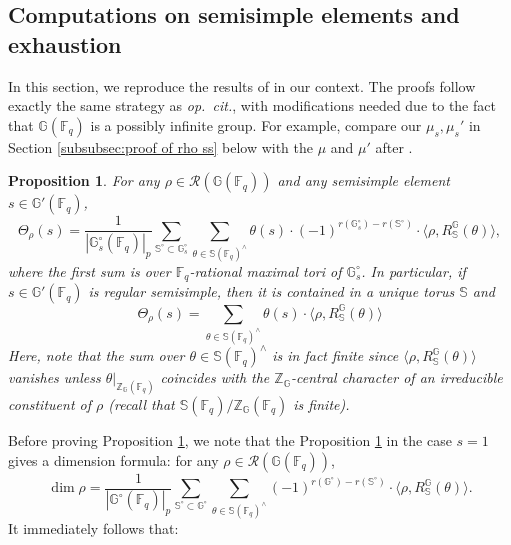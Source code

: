 \documentclass{amsart}
\newcommand{\F}{\mathbb{F}}
\newcommand{\FF}{\mathbb{F}}
\newcommand{\bbS}{\mathbb{S}}
\newcommand{\bbG}{\mathbb{G}}
\newcommand{\bbZ}{\mathbb{Z}}
\newcommand{\cR}{\mathcal{R}}
\theoremstyle{plain}
\newtheorem{prop}[thm]{Proposition}
\theoremstyle{definition}
\theoremstyle{remark}
\theoremstyle{theorem}
\begin{document}
\subsection{Computations on semisimple elements and exhaustion}\label{subsec:semisimple}

In this section, we reproduce the results of \cite[Section 7]{DL76} in our context. The proofs follow exactly the same strategy as \textit{op.\ cit.}, with modifications needed due to the fact that $\bbG(\FF_q)$ is a possibly infinite group. For example, compare our $\mu_s,\mu_s'$ in Section \ref{subsubsec:proof of rho ss} below with the $\mu$ and $\mu'$ after \cite[Proposition 7.5]{DL76}.

\begin{prop}\label{prop:rho ss}
    For any $\rho \in \cR(\bbG(\FF_q))$ and any semisimple element $s \in \bbG'(\FF_q)$, 
    \begin{equation*}
        \Theta_\rho(s) = \frac{1}{|\bbG_{s}^{\circ}(\F_{q})|_p} \sum_{\bbS^\circ \subset \bbG_{s}^\circ} \sum_{\theta \in \bbS(\FF_q)^\wedge} \theta(s) \cdot (-1)^{r(\bbG_s^\circ) - r(\bbS^\circ)} \cdot \langle \rho, R_{\bbS}^{\bbG}(\theta) \rangle,
    \end{equation*}
    where the first sum is over $\F_{q}$-rational maximal tori of $\bbG_{s}^{\circ}$.
    In particular, if $s \in \bbG'(\FF_q)$ is regular semisimple, then it is contained in a unique torus $\bbS$ and
    \begin{equation*}
        \Theta_\rho(s) = \sum_{\theta \in \bbS(\FF_q)^\wedge} \theta(s) \cdot \langle \rho, R_{\bbS}^{\bbG}(\theta) \rangle
    \end{equation*}
    Here, note that the sum over $\theta \in \bbS(\FF_q)^\wedge$ is in fact finite since $\langle \rho, R_{\bbS}^{\bbG}(\theta) \rangle$ vanishes unless $\theta|_{\bbZ_{\bbG}(\F_{q})}$ coincides with the $\bbZ_{\bbG}$-central character of an irreducible constituent of $\rho$ (recall that $\bbS(\F_{q})/\bbZ_{\bbG}(\F_{q})$ is finite).
\end{prop}

Before proving Proposition \ref{prop:rho ss}, we note that the Proposition \ref{prop:rho ss} in the case $s = 1$ gives a dimension formula: for any $\rho \in \cR(\bbG(\FF_q))$,
\begin{equation*}
    \dim \rho = \frac{1}{|\bbG^\circ(\FF_q)|_p} \sum_{\bbS^\circ \subset \bbG^\circ} \sum_{\theta \in \bbS(\FF_q)^\wedge} (-1)^{r(\bbG^\circ) - r(\bbS^\circ)} \cdot \langle \rho, R_\bbS^\bbG(\theta) \rangle.
\end{equation*}
It immediately follows that:
\end{document}
